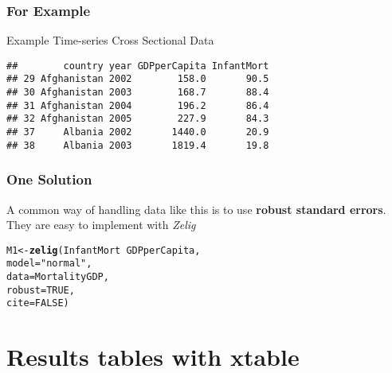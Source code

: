 \documentclass{beamer}\usepackage{graphicx, color}
\makeatletter
\newcommand{\hlfunctioncall}[1]{\textcolor[rgb]{0.501960784313725,0,0.329411764705882}{\textbf{#1}}}%
\newcommand{\hlstring}[1]{\textcolor[rgb]{0.6,0.6,1}{#1}}%
\newenvironment{kframe}{%
 \def\at@end@of@kframe{}%
 \ifinner\ifhmode%
  \def\at@end@of@kframe{\end{minipage}}%
  \begin{minipage}{\columnwidth}%
 \fi\fi%
 \def\FrameCommand##1{\hskip\@totalleftmargin \hskip-\fboxsep
 \colorbox{shadecolor}{##1}\hskip-\fboxsep
     \hskip-\linewidth \hskip-\@totalleftmargin \hskip\columnwidth}%
 \MakeFramed {\advance\hsize-\width
   \@totalleftmargin\z@ \linewidth\hsize
   \@setminipage}}%
 {\par\unskip\endMakeFramed%
 \at@end@of@kframe}
\newenvironment{knitrout}{}{} %
\makeatother
\begin{document}
\begin{frame}[fragile]
  \frametitle{For Example}
  {\LARGE{Example Time-series Cross Sectional Data}}
\begin{knitrout}
\color{fgcolor}\begin{kframe}
\begin{verbatim}
##        country year GDPperCapita InfantMort
## 29 Afghanistan 2002        158.0       90.5
## 30 Afghanistan 2003        168.7       88.4
## 31 Afghanistan 2004        196.2       86.4
## 32 Afghanistan 2005        227.9       84.3
## 37     Albania 2002       1440.0       20.9
## 38     Albania 2003       1819.4       19.8
\end{verbatim}
\end{kframe}
\end{knitrout}

\end{frame}

\begin{frame}[fragile]
  \frametitle{One Solution}
  A common way of handling data like this is to use \textbf{robust standard errors}. \\[0.5cm]
  They are easy to implement with \emph{Zelig}


\begin{knitrout}
\color{fgcolor}\begin{kframe}
\begin{alltt}
M1 <- \hlfunctioncall{zelig}(InfantMort ~ GDPperCapita, 
            model = \hlstring{"normal"},
            data = MortalityGDP,
            robust = TRUE,
            cite = FALSE)
\end{alltt}
\end{kframe}
\end{knitrout}

\end{frame}


\section{Results tables with xtable}
\end{document}
